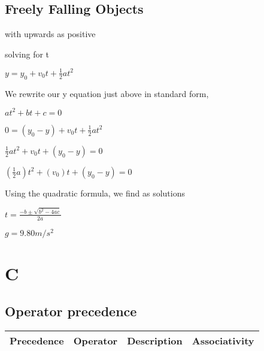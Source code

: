 \documentclass{extarticle}
\begin{document}
\begin{tcolorbox}[enhanced jigsaw,sharp corners,coltext=black,colback=BurntOrange!25!white,boxrule=0pt,breakable,size=minimal]
\subsection{Freely Falling Objects}

with upwards as positive

solving for t

$y = y_0 + v_0t + \frac{1}{2}at^2$

We rewrite our y equation just above in standard form,

$at^2 + bt + c = 0$

$0 = (y_0 - y) + v_0t + \frac{1}{2}at^2$

$\frac{1}{2}at^2 + v_0t + (y_0 - y) = 0$

$(\frac{1}{2}a)t^2 + (v_0)t + (y_0 - y) = 0$

Using the quadratic formula, we find as solutions

$t=\frac{-b\pm\sqrt{b^2-4ac}}{2a}$

$g = 9.80 m/s^2$



\end{tcolorbox}



\section{C}

\subsection{Operator precedence}

\begin{tabular}{|l|l|l|l|}
\hline
Precedence     & Operator                                              & Description                                                            & Associativity \\ \hline
\end{tabular}
\end{document}
